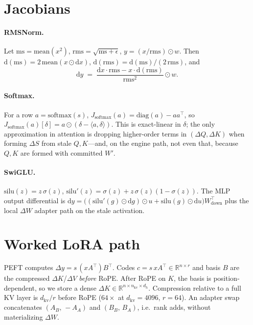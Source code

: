 \documentclass{article}
\begin{document}



\newpage
\appendix
\section{Jacobians}
\label{app:jac}

\paragraph{RMSNorm.}
Let $\mathrm{ms}=\mathrm{mean}(x^2)$, $\mathrm{rms}=\sqrt{\mathrm{ms}+\epsilon}$,
$y=(x/\mathrm{rms})\odot w$. Then
$\mathrm{d}(\mathrm{ms})=2\,\mathrm{mean}(x\odot\mathrm{d}x)$,
$\mathrm{d}(\mathrm{rms})=\mathrm{d}(\mathrm{ms})/(2\,\mathrm{rms})$, and
\begin{equation}
  \mathrm{d}y
  \;=\;
  \frac{\mathrm{d}x\cdot\mathrm{rms}-x\cdot\mathrm{d}(\mathrm{rms})}{\mathrm{rms}^2}\odot w.
\end{equation}

\paragraph{Softmax.}
For a row $a=\mathrm{softmax}(s)$,
$J_{\mathrm{softmax}}(a)=\mathrm{diag}(a)-aa^\top$, so
$J_{\mathrm{softmax}}(a)[\delta]=a\odot(\delta-\langle a,\delta\rangle)$.
This is exact-linear in $\delta$; the only approximation in attention is
dropping higher-order terms in $(\Delta Q,\Delta K)$ when forming
$\Delta S$ from stale $Q,K$---and, on the engine path, not even that,
because $Q,K$ are formed with committed $W'$.

\paragraph{SwiGLU.}
$\mathrm{silu}(z)=z\,\sigma(z)$,
$\mathrm{silu}'(z)=\sigma(z)+z\,\sigma(z)(1-\sigma(z))$.
The MLP output differential is
$\mathrm{d}y = \bigl((\mathrm{silu}'(g)\odot\mathrm{d}g)\odot u
 + \mathrm{silu}(g)\odot\mathrm{d}u\bigr)W_{\mathrm{down}}^\top$
plus the local $\Delta W$ adapter path on the stale activation.

\section{Worked LoRA path}
\label{app:lora}

PEFT computes $\Delta y = s\,(x A^\top)B^\top$.
Codes $c=s\,xA^\top\in\mathbb{R}^{n\times r}$ and basis $B$ are the
compressed $\Delta K$/$\Delta V$ \emph{before} RoPE.
After RoPE on $K$, the basis is position-dependent, so we store a dense
$\Delta K\in\mathbb{R}^{n\times n_{\mathrm{kv}}\times d_h}$.
Compression relative to a full KV layer is $d_{\mathrm{kv}}/r$ before
RoPE ($64\times$ at $d_{\mathrm{kv}}=4096$, $r=64$).
An adapter swap concatenates $(A_B,\,{-}A_A)$ and $(B_B,\,B_A)$, i.e.\
rank adds, without materializing $\Delta W$.
\end{document}
